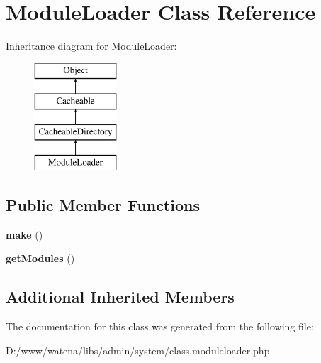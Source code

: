\hypertarget{class_module_loader}{\section{Module\-Loader Class Reference}
\label{class_module_loader}
}
Inheritance diagram for Module\-Loader\-:\begin{figure}[H]
\begin{center}
\leavevmode
\includegraphics[height=4.000000cm]{class_module_loader}
\end{center}
\end{figure}
\subsection*{Public Member Functions}
\begin{DoxyCompactItemize}
\item 
\hypertarget{class_module_loader_ac6997d86a199b882f6ebe56748f5be57}{{\bfseries make} ()}\label{class_module_loader_ac6997d86a199b882f6ebe56748f5be57}

\item 
\hypertarget{class_module_loader_ae4226f4d84a5986e5f1df1d41c1425ce}{{\bfseries get\-Modules} ()}\label{class_module_loader_ae4226f4d84a5986e5f1df1d41c1425ce}

\end{DoxyCompactItemize}
\subsection*{Additional Inherited Members}


The documentation for this class was generated from the following file\-:\begin{DoxyCompactItemize}
\item 
D\-:/www/watena/libs/admin/system/class.\-moduleloader.\-php\end{DoxyCompactItemize}
